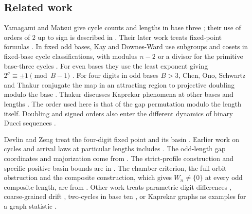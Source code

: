 \documentclass[11pt,reqno]{amsart}
\begin{document}
\subsection*{Related work}
Yamagami and Matsui give cycle counts and lengths in base three \cite{YM18}; their use of orders of 2 up to sign is described in \cite[Section~2]{KD1}. Their later work treats fixed-point formulas \cite{YM19}. In fixed odd bases, Kay and Downes-Ward use subgroups and cosets in fixed-base cycle classifications, with modulus \(n-2\) or a divisor for the primitive base-three cycles \cite[Sections~2, 3 and~5; Definition~1 and Theorem~2]{KD1}. For even bases they use the least exponent giving \(2^\sigma\equiv\pm1\pmod{B-1}\) \cite[Definition~7 and Theorem~9]{KD2}. For four digits in odd bases \(B>3\), Chen, Ono, Schwartz and Thakur conjugate the map in an attracting region to projective doubling modulo the base \cite[Theorem~1]{COST}. Thakur discusses Kaprekar phenomena at other bases and lengths \cite{Thakur}. The order used here is that of the gap permutation modulo the length itself. Doubling and signed orders also enter the different dynamics of binary Ducci sequences \cite{BS,CST}.

Devlin and Zeng treat the four-digit fixed point and its basin \cite{DZ}. Earlier work on cycles and arrival laws at particular lengths includes \cite{G1,G2,G3,G5,G6,G7,G8}. The odd-length gap coordinates and majorization come from \cite{G4}. The strict-profile construction and specific positive basin bounds are in \cite{G9}. The chamber criterion, the full-orbit obstruction and the composite construction, which gives \(W_n\ne\{0\}\) at every odd composite length, are from \cite{G10}. Other work treats parametric digit differences \cite{Nuez}, coarse-grained drift \cite{Dahl}, two-cycles in base ten \cite{Mayne}, or Kaprekar graphs as examples for a graph statistic \cite{Csikos}.
\end{document}

